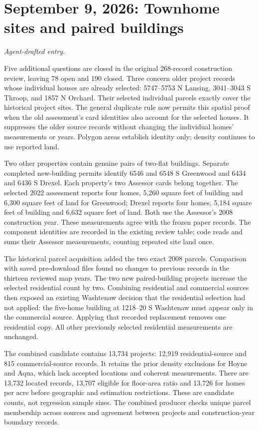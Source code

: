 \clearpage
\section*{September 9, 2026: Townhome sites and paired buildings}
\textit{Agent-drafted entry.}

Five additional questions are closed in the original 268-record construction review, leaving 78 open and 190 closed. Three concern older project records whose individual houses are already selected: 5747--5753 N Lansing, 3041--3043 S Throop, and 1857 N Orchard. Their selected individual parcels exactly cover the historical project sites. The general duplicate rule now permits this spatial proof when the old assessment's card identities also account for the selected houses. It suppresses the older source records without changing the individual homes' measurements or years. Polygon areas establish identity only; density continues to use reported land.

Two other properties contain genuine pairs of two-flat buildings. Separate completed new-building permits identify 6546 and 6548 S Greenwood and 6434 and 6436 S Drexel. Each property's two Assessor cards belong together. The selected 2022 assessment reports four homes, 5,260 square feet of building and 6,300 square feet of land for Greenwood; Drexel reports four homes, 5,184 square feet of building and 6,632 square feet of land. Both use the Assessor's 2008 construction year. These measurements agree with the frozen paper records. The component identities are recorded in the existing review table; code reads and sums their Assessor measurements, counting repeated site land once.

The historical parcel acquisition added the two exact 2008 parcels. Comparison with saved pre-download files found no changes to previous records in the thirteen reviewed map years. The two new paired-building projects increase the selected residential count by two. Combining residential and commercial sources then exposed an existing Washtenaw decision that the residential selection had not applied: the five-home building at 1218--20 S Washtenaw must appear only in the commercial source. Applying that recorded replacement removes one residential copy. All other previously selected residential measurements are unchanged.

The combined candidate contains 13,734 projects: 12,919 residential-source and 815 commercial-source records. It retains the prior density exclusions for Hoyne and Aqua, which lack accepted locations and coherent measurements. There are 13,732 located records, 13,707 eligible for floor-area ratio and 13,726 for homes per acre before geographic and estimation restrictions. These are candidate counts, not regression sample sizes. The combined producer checks unique parcel membership across sources and agreement between projects and construction-year boundary records.

